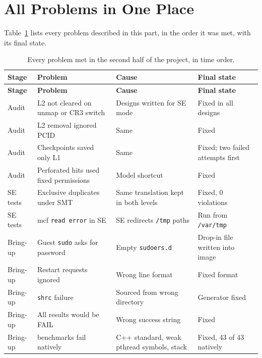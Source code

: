 \section{All Problems in One Place}
\label{sec:chr_ledger}

Table~\ref{tab:chr_ledger} lists every problem described in this part, in the order it was met, with its final state.

\begingroup
\small
\begin{longtable}{>{\raggedright\arraybackslash}p{1.6cm} >{\raggedright\arraybackslash}p{4.4cm} >{\raggedright\arraybackslash}p{5.2cm} >{\raggedright\arraybackslash}p{2.6cm}}
\caption{Every problem met in the second half of the project, in time order.}
\label{tab:chr_ledger}\\
\toprule
\textbf{Stage} & \textbf{Problem} & \textbf{Cause} & \textbf{Final state} \\
\midrule
\endfirsthead
\toprule
\textbf{Stage} & \textbf{Problem} & \textbf{Cause} & \textbf{Final state} \\
\midrule
\endhead
Audit & L2 not cleared on unmap or CR3 switch & Designs written for SE mode & Fixed in all designs \\
Audit & L2 removal ignored PCID & Same & Fixed \\
Audit & Checkpoints saved only L1 & Same & Fixed; two failed attempts first \\
Audit & Perforated hits used fixed permissions & Model shortcut & Fixed \\
SE tests & Exclusive duplicates under SMT & Same translation kept in both levels & Fixed, 0 violations \\
SE tests & mcf \texttt{read error} in SE & SE redirects \texttt{/tmp} paths & Run from \texttt{/var/tmp} \\
Bring-up & Guest \texttt{sudo} asks for password & Empty \texttt{sudoers.d} & Drop-in file written into image \\
Bring-up & Restart requests ignored & Wrong line format & Fixed format \\
Bring-up & \texttt{shrc} failure & Sourced from wrong directory & Generator fixed \\
Bring-up & All results would be FAIL & Wrong success string & Fixed \\
Bring-up & 8 benchmarks fail natively & C++ standard, weak pthread symbols, stack & Fixed, 43 of 43 natively \\

\end{longtable}
